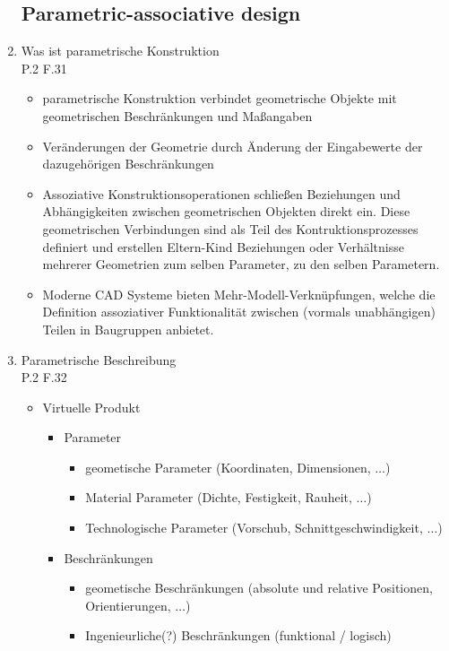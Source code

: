 \documentclass[10pt,a4paper,fleqn]{article}
\begin{document}
\begin{enumerate}
\subsection{Parametric-associative design}
	 \item Was ist parametrische Konstruktion\\
	 	P.2 F.31
	 	\begin{itemize}
	 		\item parametrische Konstruktion verbindet geometrische Objekte mit geometrischen Beschränkungen und Maßangaben
	 		\item Veränderungen der Geometrie durch Änderung der Eingabewerte der dazugehörigen Beschränkungen
	 		\item Assoziative Konstruktionsoperationen schließen Beziehungen und Abhängigkeiten zwischen geometrischen Objekten direkt ein. Diese geometrischen Verbindungen sind als Teil des Kontruktionsprozesses definiert und erstellen Eltern-Kind Beziehungen oder Verhältnisse mehrerer Geometrien zum selben Parameter, zu den selben Parametern.
	 		\item Moderne CAD Systeme bieten Mehr-Modell-Verknüpfungen, welche die Definition assoziativer Funktionalität zwischen (vormals unabhängigen) Teilen in Baugruppen anbietet.
	 	\end{itemize}
	 \item Parametrische Beschreibung\\
	 	P.2 F.32
	 	\begin{itemize}
	 		\item Virtuelle Produkt
	 			\begin{itemize}
	 				\item Parameter
	 					\begin{itemize}
	 						\item geometische Parameter (Koordinaten, Dimensionen, $\dots$)
	 						\item Material Parameter (Dichte, Festigkeit, Rauheit, $\dots$)
	 						\item Technologische Parameter (Vorschub, Schnittgeschwindigkeit, $\dots$)
	 					\end{itemize}
	 				\item Beschränkungen
	 					\begin{itemize}
	 						\item geometische Beschränkungen (absolute und relative Positionen, Orientierungen, $\dots$)
	 						\item Ingenieurliche(?) Beschränkungen (funktional / logisch)
	 					\end{itemize}

\end{itemize}
\end{itemize}
\end{enumerate}
\end{document}
